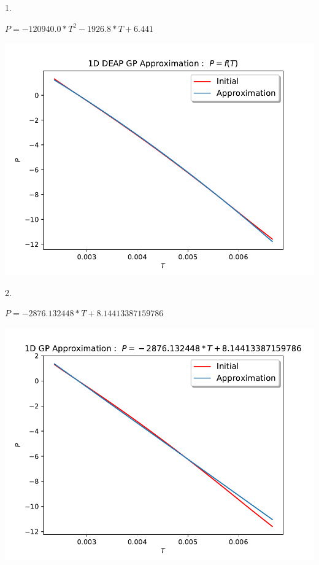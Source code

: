 \documentclass[english,12pt,a4paper]{article}
\theoremstyle{definition}
\begin{document}
1.

$P=-120940.0*T^{2}-1926.8*T+6.441$

\includegraphics[scale=0.7]{Test1DGplearn2}

\vspace{0.5cm}

2. 

$P=-2876.132448*T+8.14413387159786$

\includegraphics[scale=0.7]{Test1D3Lin}

\newpage{}
\end{document}
